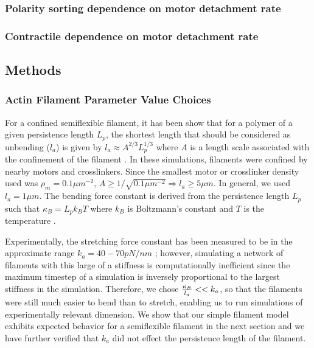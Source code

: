 \documentclass[12pt]{article}
\begin{document}
\subsubsection{Polarity sorting dependence on motor detachment rate}
\subsubsection{Contractile dependence on motor detachment rate}
\subsection{Methods}
\subsubsection{Actin Filament Parameter Value Choices}
For a confined semiflexible filament, it has been show that for a polymer of a
given persistence length $L_p$, the shortest length that should be considered as
unbending ($l_a$) is given by $l_a\approx A^{2/3}L_p^{1/3}$ where $A$ is a
length scale associated with the confinement of the
filament \cite{odijk1983}. In these simulations, filaments were confined by
nearby motors and crosslinkers. Since the smallest motor or crosslinker density
used was $\rho_m=0.1\mu m^{-2}$, $A\ge1/\sqrt{0.1\mu m^{-2}}\Rightarrow l_a\ge5\mu m$.
In general, we used $l_a=1\mu m$. The bending force constant is derived from the
persistence length $L_p$ such that $\kappa_B = L_p k_B T$ where $k_B$ is
Boltzmann's constant and $T$ is the temperature . 
\par
Experimentally, the stretching force constant has been measured to be in the approximate range
$k_a=40-70pN/nm$ \cite{kojima1994, higuchi1995}; however, simulating a
network of filaments with this large of a stiffness is computationally
inefficient since the maximum timestep of a simulation is inversely proportional
to the largest stiffness in the simulation. Therefore, we chose ${\kappa_B\over
l_a} <<k_a$, so that the filaments were still much easier to bend than to
stretch, enabling us to run simulations of
experimentally relevant dimension. We show that our simple filament model
exhibits expected behavior for a semiflexible filament in the next section and
we have further verified that $k_a$ did not effect the persistence length of the
filament.
\end{document}
